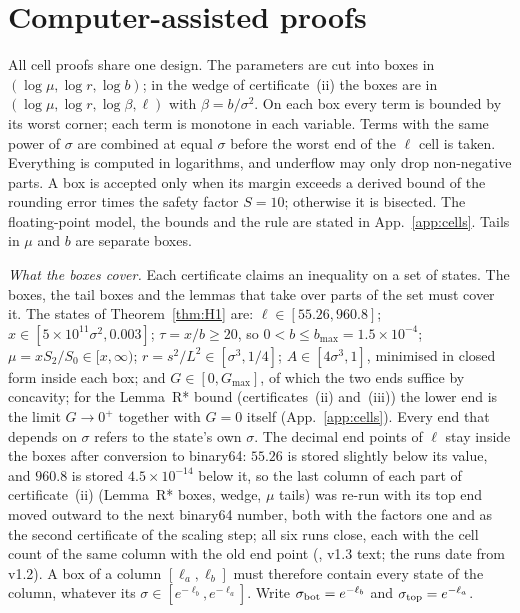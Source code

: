 \section{Computer-assisted proofs}
\label{sec:cert}

All cell proofs share one design.
The parameters are cut into boxes in $(\log\mu,\log r,\log b)$; in the wedge of certificate~(ii) the boxes are in $(\log\mu,\log r,\log\beta,\ell)$ with $\beta=b/\sigma^2$.
On each box every term is bounded by its worst corner; each term is monotone in each variable.
Terms with the same power of $\sigma$ are combined at equal $\sigma$ before the worst end of the $\ell$ cell is taken.
Everything is computed in logarithms, and underflow may only drop non-negative parts.
A box is accepted only when its margin exceeds a derived bound of the rounding error times the safety factor $S=10$; otherwise it is bisected.
The floating-point model, the bounds and the rule are stated in App.~\ref{app:cells}.
Tails in $\mu$ and $b$ are separate boxes.

\emph{What the boxes cover.}
Each certificate claims an inequality on a set of states.
The boxes, the tail boxes and the lemmas that take over parts of the set must cover it.
The states of Theorem~\ref{thm:H1} are:
$\ell\in[55.26,960.8]$;
$x\in[5\times10^{11}\sigma^2,0.003]$;
$\tau=x/b\ge20$, so $0<b\le b_{\max}=1.5\times10^{-4}$;
$\mu=xS_2/S_0\in[x,\infty)$;
$r=s^2/L^2\in[\sigma^3,1/4]$;
$A\in[4\sigma^3,1]$, minimised in closed form inside each box;
and $G\in[0,G_{\max}]$, of which the two ends suffice by concavity; for the Lemma~R* bound (certificates~(ii) and~(iii)) the lower end is the limit $G\to0^+$ together with $G=0$ itself (App.~\ref{app:cells}).
Every end that depends on $\sigma$ refers to the state's own $\sigma$.
The decimal end points of $\ell$ stay inside the boxes after conversion to binary64: $55.26$ is stored slightly below its value, and $960.8$ is stored $4.5\times10^{-14}$ below it, so the last column of each part of certificate~(ii) (Lemma~R* boxes, wedge, $\mu$ tails) was re-run with its top end moved outward to the next binary64 number, both with the factors one and as the second certificate of the scaling step; all six runs close, each with the cell count of the same column with the old end point (, v1.3 text; the runs date from v1.2).
A box of a column $[\ell_a,\ell_b]$ must therefore contain every state of the column, whatever its $\sigma\in[e^{-\ell_b},e^{-\ell_a}]$.
Write $\sigma_{\rm bot}=e^{-\ell_b}$ and $\sigma_{\rm top}=e^{-\ell_a}$.

